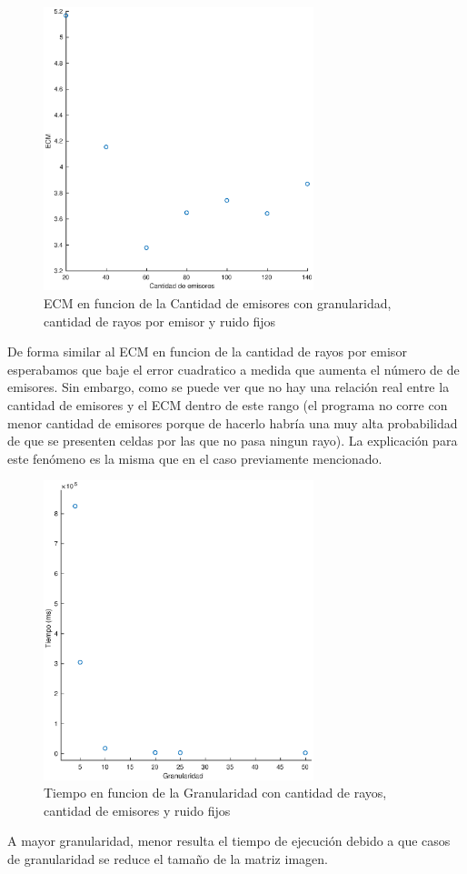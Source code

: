 \begin{figure}[H]
	\centering	\includegraphics[width=0.7\textwidth]{img/emi_ecm}
	\caption{ECM en funcion de la Cantidad de emisores con granularidad, cantidad de rayos por emisor y ruido fijos}
	\label{fig:emi_ecm}
\end{figure}
De forma similar al ECM en funcion de la cantidad de rayos por emisor esperabamos que baje el error cuadratico a medida que aumenta el número de de emisores. Sin embargo, como se  puede ver que no hay una relación real entre la cantidad de emisores y el ECM dentro de este rango (el programa no corre con menor cantidad de emisores porque de hacerlo habría una muy alta probabilidad de que se presenten celdas por las que no pasa ningun rayo). La explicación para este fenómeno es la misma que en el caso previamente mencionado.

\begin{figure}[H]
	\centering	\includegraphics[width=0.7\textwidth]{img/granu_tiempo}
	\caption{Tiempo en funcion de la Granularidad con cantidad de rayos, cantidad de emisores y ruido fijos}
	\label{fig:granu_tiempo}
\end{figure}
\par A mayor granularidad, menor resulta el tiempo de ejecuci\'on debido a que casos de granularidad se reduce el tamaño de la matriz imagen.

